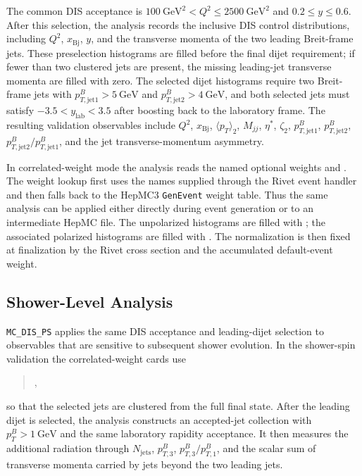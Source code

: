 \documentclass[a4paper,11pt]{article}
\begin{document}
The common DIS acceptance is
$100~\mathrm{GeV}^2 < Q^2 \le 2500~\mathrm{GeV}^2$ and
$0.2 \le y \le 0.6$. After this selection, the analysis records the inclusive
DIS control distributions, including $Q^2$, $x_{\mathrm{Bj}}$, $y$, and the
transverse momenta of the two leading Breit-frame jets. These preselection
histograms are filled before the final dijet requirement; if fewer than two
clustered jets are present, the missing leading-jet transverse momenta are
filled with zero. The selected dijet histograms require two Breit-frame jets
with
$p_{T,\mathrm{jet1}}^B>5~\mathrm{GeV}$ and
$p_{T,\mathrm{jet2}}^B>4~\mathrm{GeV}$, and both selected jets must satisfy
$-3.5<y_{\mathrm{lab}}<3.5$ after boosting back to the laboratory frame. The
resulting validation observables include $Q^2$, $x_{\mathrm{Bj}}$,
$\langle p_T\rangle_2$, $M_{jj}$, $\eta^\ast$, $\zeta_2$,
$p_{T,\mathrm{jet1}}^B$, $p_{T,\mathrm{jet2}}^B$,
$p_{T,\mathrm{jet2}}^B/p_{T,\mathrm{jet1}}^B$, and the jet
transverse-momentum asymmetry.

In correlated-weight mode the analysis reads the named optional weights
 and . The weight lookup first
uses the names supplied through the Rivet event handler and then falls back to
the HepMC3 \texttt{GenEvent} weight table. Thus the same analysis can be applied
either directly during event generation or to an intermediate HepMC file. The
unpolarized histograms are filled with ; the associated
polarized histograms are filled with . The
normalization is then fixed at finalization by the Rivet cross section and the
accumulated default-event weight.

\subsection{Shower-Level Analysis}

\texttt{MC\_DIS\_PS} applies the same DIS acceptance and leading-dijet
selection to observables that are sensitive to subsequent shower evolution. In
the shower-spin validation the correlated-weight cards use
\begin{quote}
\small{},
\end{quote}
so that the selected jets are clustered from the full final state. After the
leading dijet is selected, the analysis constructs an accepted-jet collection
with $p_T^B>1~\mathrm{GeV}$ and the same laboratory rapidity acceptance. It then
measures the additional radiation through $N_{\mathrm{jets}}$, $p_{T,3}^B$,
$p_{T,3}^B/p_{T,1}^B$, and the scalar sum of transverse momenta carried by jets
beyond the two leading jets.
\end{document}
